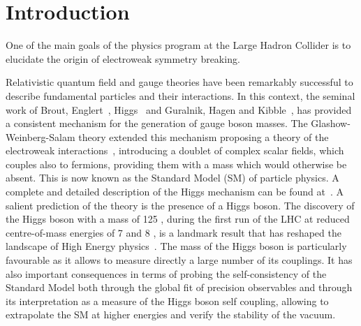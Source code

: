 \documentclass[../report.tex]{subfiles}
\begin{document}
\section{Introduction}


One of the main goals of the physics program at the Large Hadron
Collider is to elucidate the origin of  electroweak symmetry
breaking.

Relativistic quantum field and gauge theories have been remarkably
successful to describe fundamental particles and their
interactions. %
In this context, the seminal work
of Brout, Englert~\cite{Englert:1964et}, Higgs~\cite{Higgs:1964ia,Higgs:1964pj,Higgs:1966ev} and Guralnik, Hagen and Kibble~\cite{Guralnik:1964eu, Kibble:1967sv}, has provided a consistent mechanism for the generation
of gauge boson masses. %
The Glashow-Weinberg-Salam theory
extended this mechanism proposing a theory of the electroweak
interactions~\cite{Glashow:1961tr,Salam:1968,Weinberg:1967tq}, introducing a doublet of complex scalar
fields, which couples also to fermions, providing them with a  mass  which would otherwise be absent. This is now known as the Standard Model (SM) of particle physics. %
A complete and detailed description of the Higgs mechanism
can be found at~\cite{Tanabashi:2018oca}. A salient prediction of the theory is the
presence of a Higgs boson.
The discovery of the Higgs boson with a mass of 125 \UGeV, during the
first run of the LHC at reduced centre-of-mass energies of 7 \UTeV and
8 \UTeV, is a landmark result that has reshaped the landscape of High
Energy physics~\cite{Aad:2012tfa,Chatrchyan:2012xdj}. 
The mass of the Higgs boson is particularly favourable
as it allows to measure directly a large number of its couplings. It
has also important consequences in terms of probing the self-consistency of the Standard Model both through the global fit of
precision observables and through its interpretation as a measure of the Higgs boson self coupling, allowing to extrapolate the SM at
higher energies and verify the stability of the vacuum.
\end{document}

